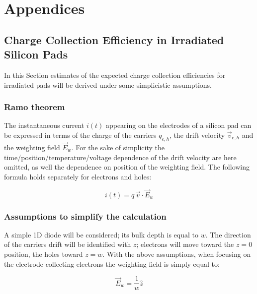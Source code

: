 \chapter{Appendices}



\section{Charge Collection Efficiency in Irradiated Silicon Pads}

In this Section estimates of the expected charge collection efficiencies 
for irradiated pads will be derived under some simplicistic assumptions.

\subsection{Ramo theorem}
\label{sec:ramo}
The instantaneous current $i(t)$ appearing on the electrodes of a silicon pad can be expressed 
in terms of the charge of the carriers $q_{e,h}$, the drift velocity $\vec{v}_{e,h}$  and the 
weighting field $\vec{E}_w$. For the sake of simplicity the time/position/temperature/voltage 
dependence of the drift velocity are here omitted, as well the dependence on position of the 
weighting field.
The following formula holds separately for electrons and holes:

\begin{equation}
i(t) = q\,\vec{v}\cdot\vec{E}_w
\end{equation} 

\subsection{Assumptions to simplify the calculation}
\label{sec:assumptions}
A simple 1D diode will be considered; its bulk depth is equal to $w$. The direction of the carriers 
drift will be identified with $z$; electrons will move toward the $z=0$ position, the holes toward $z=w$.
With the above assumptions, when focusing on the electrode collecting electrons 
the weighting field is simply equal to:

\begin{equation}
\vec{E}_w=\dfrac{1}{w}\hat{z}
\end{equation}

